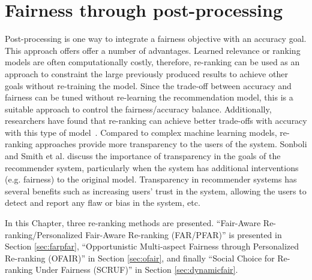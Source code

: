 \chapter{Fairness through post-processing}
\label{ch:fairness_postproc}

Post-processing is one way to integrate a fairness objective with an accuracy goal. This approach offers offer a number of advantages. Learned relevance or ranking models are often computationally costly, therefore, re-ranking can be used as an approach to constraint the large previously produced results to achieve other goals without re-training the model. Since the trade-off between accuracy and fairness can be tuned without re-learning the recommendation model, this is a suitable approach to control the fairness/accuracy balance. Additionally, researchers have found that re-ranking can achieve better trade-offs with accuracy with this type of model~\cite{abdollahpouri2019managing,liu2019personalized}. Compared to complex machine learning models, re-ranking approaches provide more transparency to the users of the system. Sonboli and Smith et al. \cite{Sonboli2021transparency} discuss the importance of transparency in the goals of the recommender system, particularly when the system has additional interventions (e.g. fairness) to the original model. Transparency in recommender systems has several benefits such as increasing users' trust in the system, allowing the users to detect and report any flaw or bias in the system, etc.

In this Chapter, three re-ranking methods are presented. ``Fair-Aware Re-ranking/Personalized Fair-Aware Re-ranking (FAR/PFAR)'' is presented in Section \ref{sec:farpfar}, ``Opportunistic Multi-aspect Fairness through Personalized Re-ranking (OFAIR)'' in Section \ref{sec:ofair}, and finally ``Social Choice for Re-ranking Under Fairness (SCRUF)'' in Section \ref{sec:dynamicfair}.





